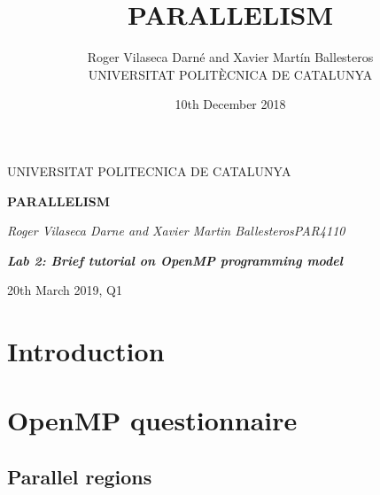 \documentclass[12pt, a4paper]{article}
\title{PARALLELISM}
\author{Roger Vilaseca Darné and Xavier Martín Ballesteros\\
  \small UNIVERSITAT POLITÈCNICA DE CATALUNYA\\
}
\date{10th December 2018}
\begin{document}
\graphicspath{ {./lab2/images} }


\begin{titlepage}
	\centering
	\vspace{1cm}
	{\scshape\Large UNIVERSITAT POLITECNICA DE CATALUNYA\par}
	\vspace{1.5cm}
	{\huge\bfseries PARALLELISM\par}
	\vspace{2cm}
	{\Large\itshape Roger Vilaseca Darne and Xavier Martin Ballesteros\break PAR4110\par}
	\vfill
	{\Large\itshape \textbf{Lab 2: Brief tutorial on OpenMP programming model}\par}
	\vfill

	\vfill

	{\large 20th March 2019, Q1}
\end{titlepage}


\setcounter{secnumdepth}{5}
\setcounter{tocdepth}{5}

\newpage
  \tableofcontents
\newpage

\section{Introduction}


\section{OpenMP questionnaire}

\subsection{Parallel regions}
\end{document}
